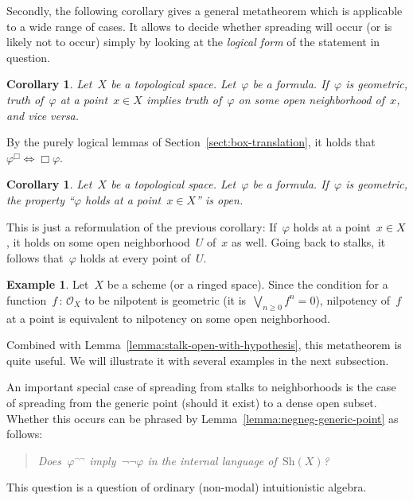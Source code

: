 \documentclass[10pt,reqno,a4paper]{amsbook}
\makeatletter
\theoremstyle{definition}
\newtheorem{ex}[defn]{Example}
\theoremstyle{plain}
\newtheorem{cor}[defn]{Corollary}
\theoremstyle{remark}
\renewcommand{\O}{\mathcal{O}}
\newcommand{\Sh}{\mathrm{Sh}}
\newcommand{\?}{\,{:}\,}
\renewcommand{\_}{\mathpunct{.}\,}
\renewenvironment{proof}[1][\proofname]{\par
  \pushQED{\qed}%
  \normalfont \topsep6\p@\@plus6\p@\relax
  \trivlist
  \item[\hskip\labelsep
        \itshape
    #1\@addpunct{.}]\ignorespaces
}{%
  \popQED\endtrivlist\@endpefalse
}
\makeatother
\begin{document}
Secondly, the following corollary gives a general metatheorem which is
applicable to a wide range of cases. It allows to decide whether spreading will
occur (or is likely not to occur) simply by looking at the \emph{logical form}
of the statement in question.

\begin{cor}\label{cor:geometric-spreading}
Let~$X$ be a topological space. Let~$\varphi$ be a formula.
If~$\varphi$ is geometric, truth of~$\varphi$ at a point~$x \in X$ implies
truth of~$\varphi$ on some open neighborhood of~$x$, and vice versa.\end{cor}
\begin{proof}By the purely logical lemmas of Section~\ref{sect:box-translation}, it holds
that~$\varphi^\Box \Leftrightarrow \Box\varphi$.
\end{proof}

\begin{cor}
Let~$X$ be a topological space. Let~$\varphi$ be a formula.
If~$\varphi$ is geometric, the property ``$\varphi$ holds at a point~$x \in
X$'' is open.
\end{cor}
\begin{proof}This is just a reformulation of the previous corollary:
If~$\varphi$ holds at a point~$x \in X$, it holds on some open
neighborhood~$U$ of~$x$ as well. Going back to stalks, it follows
that~$\varphi$ holds at every point of~$U$.\end{proof}

\begin{ex}Let~$X$ be a scheme (or a ringed space). Since the condition for a
function~$f\?\O_X$ to be nilpotent is geometric (it is~$\bigvee_{n \geq 0} f^n
= 0$), nilpotency of~$f$ at a point is equivalent to nilpotency on some open
neighborhood.\end{ex}

Combined with Lemma~\ref{lemma:stalk-open-with-hypothesis}, this metatheorem is
quite useful. We will illustrate it with several examples in the next subsection.

An important special case of spreading from stalks to neighborhoods is the
case of spreading from the generic point (should it exist) to a dense open
subset. Whether this occurs can be phrased by
Lemma~\ref{lemma:negneg-generic-point} as follows:
\begin{quote}
\emph{Does~$\varphi^{\neg\neg}$ imply~$\neg\neg\varphi$ in the internal language
of~$\Sh(X)$?}
\end{quote}
This question is a question of ordinary (non-modal) intuitionistic algebra.
\end{document}
